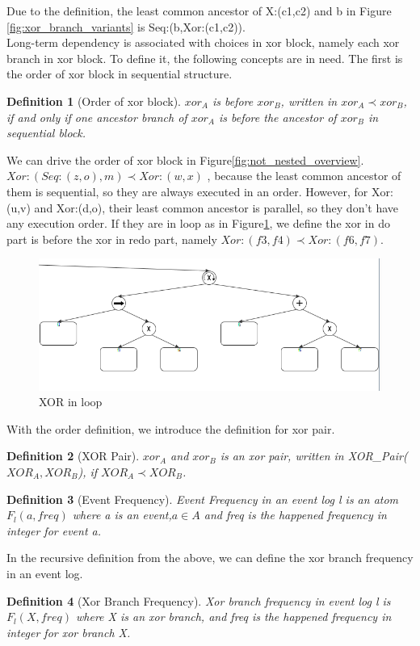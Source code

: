 \documentclass[]{article}
\newtheorem{mydef}{Definition}[section]
\begin{document}
Due to the definition, the least common ancestor of X:(c1,c2) and b in Figure \ref{fig:xor_branch_variants} is Seq:(b,Xor:(c1,c2)).\\
Long-term dependency is associated with choices in xor block, namely each xor branch in xor block. To define it, the following concepts are in need. The first is the order of xor block in sequential structure.
\begin{mydef}[Order of xor block]
	$xor_A$ is before $xor_B$, written in $xor_A \prec xor_B$, if and only if one ancestor branch of $xor_A$ is before the ancestor of $xor_B$ in sequential block. 
\end{mydef}
We can drive the order of xor block in Figure\ref{fig:not_nested_overview}. $Xor:(Seq:(z,o),m) \prec Xor:(w,x)$ , because the least common ancestor of them is sequential, so they are always executed in an order. However, for Xor:(u,v) and Xor:(d,o), their least common ancestor is parallel, so they don't have any execution order. If they are in loop as in Figure\ref{fig:xor_in_loop}, we define the xor in do part is before the xor in redo part, namely $Xor:(f3,f4) \prec Xor:(f6,f7)$.
\begin{figure}[h!]
	\includegraphics[width=\textwidth]{PT03_xor_in_loop.png}
	\caption{XOR in loop}
	\label{fig:xor_in_loop}
\end{figure}
With the order definition, we introduce the definition for xor pair.
\begin{mydef}[XOR Pair]
	$xor_A$ and $xor_B$ is an xor pair, written in XOR\_Pair($XOR_A, XOR_B$), if $XOR_A \prec XOR_B$.
\end{mydef}
\begin{mydef}[Event Frequency]
	Event Frequency in an event log l is an atom $F_{l}(a,freq)$ where a is an event,$a \in A$  and freq is the happened frequency in integer for event a.
\end{mydef}
In the recursive definition from the above, we can define the xor branch frequency in an event log.
\begin{mydef}[Xor Branch Frequency]
	Xor branch frequency in event log l is $F_{l}(X,freq)$ where X is an xor branch, and freq is the happened frequency in integer for xor branch X.
\end{mydef}
\end{document}
